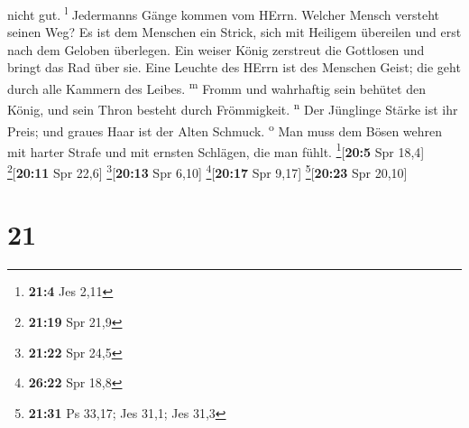 nicht gut. \textsuperscript{l}  Jedermanns Gänge kommen
vom HErrn. Welcher Mensch versteht seinen Weg?  Es ist
dem Menschen ein Strick, sich mit Heiligem übereilen und erst nach dem
Geloben überlegen.  Ein weiser König zerstreut die
Gottlosen und bringt das Rad über sie.  Eine Leuchte des
HErrn ist des Menschen Geist; die geht durch alle Kammern des Leibes.
\textsuperscript{m}  Fromm und wahrhaftig sein behütet
den König, und sein Thron besteht durch Frömmigkeit. \textsuperscript{n}
 Der Jünglinge Stärke ist ihr Preis; und graues Haar ist
der Alten Schmuck. \textsuperscript{o}  Man muss dem
Bösen wehren mit harter Strafe und mit ernsten Schlägen, die man fühlt.
\footnote{\textbf{21:4} Jes 2,11}{[}\textbf{20:5} Spr 18,4{]}
\footnote{\textbf{21:19} Spr 21,9}{[}\textbf{20:11} Spr 22,6{]}
\footnote{\textbf{21:22} Spr 24,5}{[}\textbf{20:13} Spr 6,10{]}
\footnote{\textbf{26:22} Spr 18,8}{[}\textbf{20:17} Spr 9,17{]}
\footnote{\textbf{21:31} Ps 33,17; Jes 31,1; Jes 31,3}{[}\textbf{20:23}
Spr 20,10{]}

\hypertarget{section-20}{%
\section{21}\label{section-20}}

